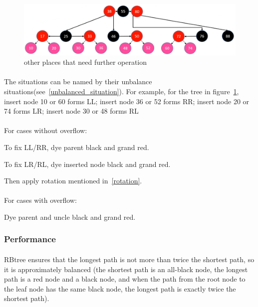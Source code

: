 \documentclass{article}
\begin{document}
\begin{figure}[htbp]
    \centering

    \includegraphics[height = 50 pt]{RBt_rejected.png}
    \caption{other places that need further operation}
    \label{RBt_rejected}
\end{figure}

\paragraph{}
The situations can be named by their unbalance situations(see~\ref{unbalanced_situation}). For example, for the tree in figure~\ref{RBt_rejected}, insert node 10 or 60 forms LL; insert node 36 or 52 forms RR; insert node 20 or 74 forms LR; insert node 30 or 48 forms RL

\paragraph{}
For cases without overflow:

To fix LL/RR, dye parent black and grand red.

To fix LR/RL, dye inserted node black and grand red.

Then apply rotation mentioned in~\ref{rotation}.

\paragraph{}
For cases with overflow:

Dye parent and uncle black and grand red.

\subsubsection{Performance}

\paragraph{}
RBtree ensures that the longest path is not more than twice the shortest path, so it is approximately balanced (the shortest path is an all-black node, the longest path is a red node and a black node, and when the path from the root node to the leaf node has the same black node, the longest path is exactly twice the shortest path).
\end{document}
